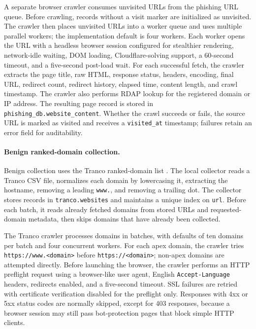 \documentclass[12pt,letterpaper]{article}
\begin{document}
A separate browser crawler consumes unvisited URLs from the phishing URL queue. Before crawling, records without a visit marker are initialized as unvisited. The crawler then places unvisited URLs into a worker queue and uses multiple parallel workers; the implementation default is four workers. Each worker opens the URL with a headless browser session configured for stealthier rendering, network-idle waiting, DOM loading, Cloudflare-solving support, a 60-second timeout, and a five-second post-load wait. For each successful fetch, the crawler extracts the page title, raw HTML, response status, headers, encoding, final URL, redirect count, redirect history, elapsed time, content length, and crawl timestamp. The crawler also performs RDAP lookup for the registered domain or IP address. The resulting page record is stored in \texttt{phishing\_db.website\_content}. Whether the crawl succeeds or fails, the source URL is marked as visited and receives a \texttt{visited\_at} timestamp; failures retain an error field for auditability.

\paragraph{Benign ranked-domain collection.}
Benign collection uses the Tranco ranked-domain list \cite{tranco2019}. The local collector reads a Tranco CSV file, normalizes each domain by lowercasing it, extracting the hostname, removing a leading \texttt{www.}, and removing a trailing dot. The collector stores records in \texttt{tranco.websites} and maintains a unique index on \texttt{url}. Before each batch, it reads already fetched domains from stored URLs and requested-domain metadata, then skips domains that have already been collected.

The Tranco crawler processes domains in batches, with defaults of ten domains per batch and four concurrent workers. For each apex domain, the crawler tries \texttt{https://www.<domain>} before \texttt{https://<domain>}; non-apex domains are attempted directly. Before launching the browser, the crawler performs an HTTP preflight request using a browser-like user agent, English \texttt{Accept-Language} headers, redirects enabled, and a five-second timeout. SSL failures are retried with certificate verification disabled for the preflight only. Responses with 4xx or 5xx status codes are normally skipped, except for 403 responses, because a browser session may still pass bot-protection pages that block simple HTTP clients.
\end{document}
